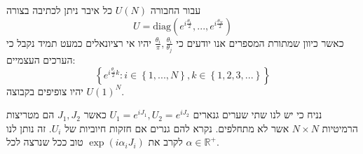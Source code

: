 \documentclass{tstextbook}
\begin{document}
\begin{corollary}
עבור החבורה \(U(N)\) כל איבר ניתן לכתיבה בצורה 
$$U=\mathrm{diag}\left(e^{i{\frac{\theta_{1}}{2}}},...,e^{i{\frac{\theta_{N}}{2}}}\right)$$
כאשר כיוון שמתורת המספרים אנו יודעים כי \(\frac{\theta_{i}}{\pi},\frac{\theta_{i}}{\theta_{j}}\) יהיו אי רציונאלים כמעט תמיד נקבל כי הערכים העצמיים:
$$\left\{e^{i\frac{\theta_{i}}{2}k}:i\in\left\{1,...,N\right\},k\in\left\{1,2,3,...\right\}\right\}$$
יהיו צופיפים בקבוצה \(U(1)^{N}\).

\end{corollary}
נניח כי יש לנו שתי שערים גנארים \(U_{1}=e^{ iJ_{1} }, U_{2}=e^{ iJ_{2} }\) כאשר \(J_{1},J_{2}\) הם מטריצות הרמיטיות \(N\times N\) אשר לא מתחלפים. נקרא להם גנרים אם חזקות חיוביות של \(U_{i}\). זה נותן לנו לקרב את \(\exp\left( i\alpha_{i}J_{i} \right)\) טוב ככל שנרצה לכל \(\alpha \in \mathbb{R}^{+}\).
\end{document}
